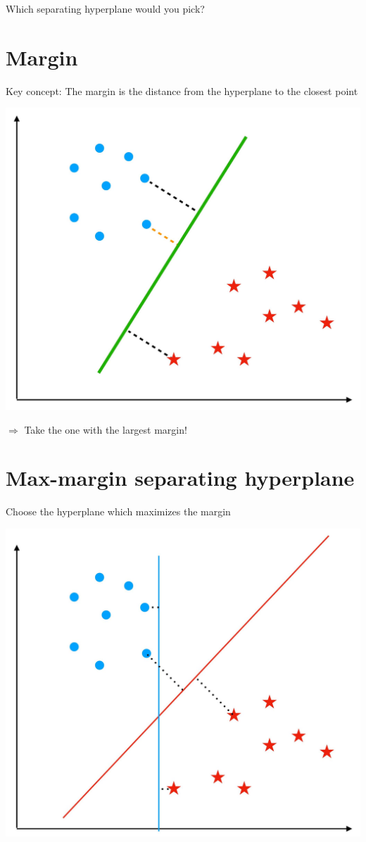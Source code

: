 \documentclass[10pt]{article}
\begin{document}
Which separating hyperplane would you pick?

\section*{Margin}
Key concept: The margin is the distance from the hyperplane to the closest point

\begin{center}
\includegraphics[max width=\textwidth]{2023_12_30_cf784c471dfd1dd5afbag-22}
\end{center}

$\Rightarrow$ Take the one with the largest margin!

\section*{Max-margin separating hyperplane}
Choose the hyperplane which maximizes the margin

\begin{center}
\includegraphics[max width=\textwidth]{2023_12_30_cf784c471dfd1dd5afbag-23}
\end{center}
\end{document}
